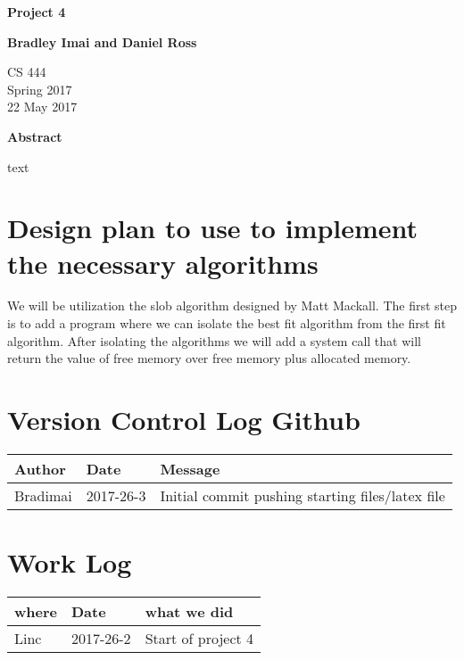 \documentclass[letterpaper,10pt,titlepage]{article}
\begin{document}
\begin{titlepage}
    \begin{center}
        \vspace*{3.5cm}

        \textbf{Project 4}

        \vspace{0.5cm}

        \textbf{Bradley Imai and Daniel Ross}

        \vspace{0.8cm}

        CS 444\\
        Spring 2017\\
        22 May 2017\\

        \vspace{1cm}

        \textbf{Abstract}\\

        \vspace{0.5cm}

        text \vfill


    \end{center}
\end{titlepage}

\newpage

\section{Design plan to use to implement the necessary algorithms}

We will be utilization the slob algorithm designed by Matt Mackall. The first step is to add a program where we can isolate the best fit algorithm from the first fit algorithm. After isolating the algorithms we will add a system call that will return the value of free memory over free memory plus allocated memory.

\section{Version Control Log Github}
\begin{tabular}{lll} \textbf{Author}
     & \textbf{Date}
     & \textbf{Message}
\\ \hline
Bradimai & 2017-26-3 & Initial commit pushing starting files/latex file \\ \hline
\end{tabular}

\section{Work Log}
\begin{tabular}{lll} \textbf{where}
     & \textbf{Date}
     & \textbf{what we did}

\\ \hline
Linc & 2017-26-2 & Start of project 4 \\ \hline
\end{tabular}
\end{document}
